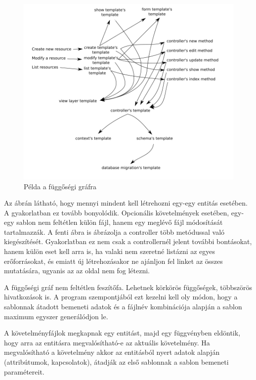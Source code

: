 \documentclass[a4paper,12pt,oneside]{report}
\begin{document}
\begin{justify}
	\begin{figure}[h]
		\includegraphics[width=\textwidth]{contents/images/dependecy_graph.png}
		\caption{Példa a függőségi gráfra}
		\label{fig:dependecy_graph}
	\end{figure}

	Az ábrán látható, hogy mennyi mindent kell létrehozni egy-egy entitás esetében. A gyakorlatban ez tovább bonyolódik. Opcionális követelmények esetében, egy-egy sablon nem feltétlen külön fájl, hanem egy meglévő fájl módosítását tartalmazzák. A fenti ábra is ábrázolja a controller több metódussal való kiegészítését. Gyakorlatban ez nem csak a controllernél jelent további bontásokat, hanem külön eset kell arra is, ha valaki nem szeretné listázni az egyes erőforrásokat, és emiatt új létrehozásakor ne ajánljon fel linket az összes mutatására, ugyanis az az oldal nem fog létezni.

	A függőségi gráf nem feltétlen feszítőfa. Lehetnek körkörös függőségek, többszörös hivatkozások is. A program szempontjából ezt kezelni kell oly módon, hogy a sablonnak átadott bemeneti adatok és a fájlnév kombinációja alapján a sablon maximum egyszer generálódjon le.

	A követelményfájlok megkapnak egy entitást, majd egy függvényben eldöntik, hogy arra az entitásra megvalósítható-e az aktuális követelmény. Ha megvalósítható a követelmény akkor az entitásból nyert adatok alapján (attribútumok, kapcsolatok), átadják az első sablonnak a sablon bemeneti paramétereit.


\end{justify}
\end{document}
